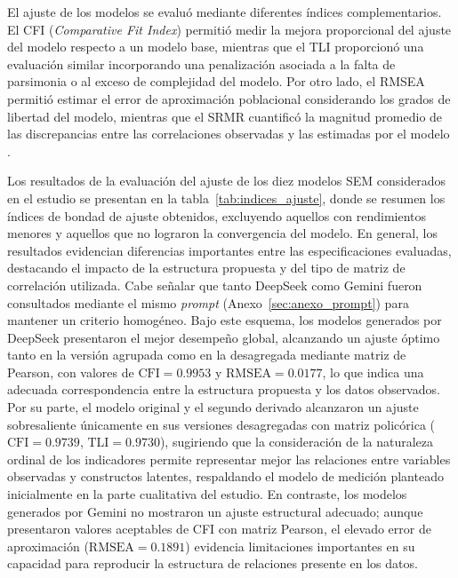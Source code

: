 \documentclass[conference]{IEEEtran}
\begin{document}
El ajuste de los modelos se evaluó mediante diferentes índices complementarios. El CFI (\textit{Comparative Fit Index}) permitió medir la mejora proporcional del ajuste del modelo respecto a un modelo base, mientras que el TLI proporcionó una evaluación similar incorporando una penalización asociada a la falta de parsimonia o al exceso de complejidad del modelo. Por otro lado, el RMSEA permitió estimar el error de aproximación poblacional considerando los grados de libertad del modelo, mientras que el SRMR cuantificó la magnitud promedio de las discrepancias entre las correlaciones observadas y las estimadas por el modelo \cite{kline2023principles}.

Los resultados de la evaluación del ajuste de los diez modelos SEM considerados en el estudio se presentan en la tabla~\ref{tab:indices_ajuste}, donde se resumen los índices de bondad de ajuste obtenidos, excluyendo aquellos con rendimientos menores y aquellos que no lograron la convergencia del modelo. En general, los resultados evidencian diferencias importantes entre las especificaciones evaluadas, destacando el impacto de la estructura propuesta y del tipo de matriz de correlación utilizada. Cabe señalar que tanto DeepSeek como Gemini fueron consultados mediante el mismo \textit{prompt} (Anexo~\ref{sec:anexo_prompt}) para mantener un criterio homogéneo. Bajo este esquema, los modelos generados por DeepSeek presentaron el mejor desempeño global, alcanzando un ajuste óptimo tanto en la versión agrupada como en la desagregada mediante matriz de Pearson, con valores de $\text{CFI} = 0.9953$ y $\text{RMSEA} = 0.0177$, lo que indica una adecuada correspondencia entre la estructura propuesta y los datos observados. Por su parte, el modelo original y el segundo derivado alcanzaron un ajuste sobresaliente únicamente en sus versiones desagregadas con matriz policórica ($\text{CFI} = 0.9739$, $\text{TLI} = 0.9730$), sugiriendo que la consideración de la naturaleza ordinal de los indicadores permite representar mejor las relaciones entre variables observadas y constructos latentes, respaldando el modelo de medición planteado inicialmente en la parte cualitativa del estudio. En contraste, los modelos generados por Gemini no mostraron un ajuste estructural adecuado; aunque presentaron valores aceptables de CFI con matriz Pearson, el elevado error de aproximación ($\text{RMSEA} = 0.1891$) evidencia limitaciones importantes en su capacidad para reproducir la estructura de relaciones presente en los datos.
\end{document}
